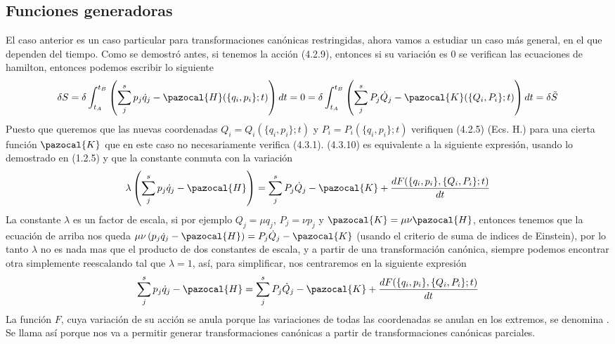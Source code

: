 \subsection{Funciones generadoras}
El caso anterior es un caso particular para transformaciones canónicas restringidas, ahora vamos a estudiar un caso más general, en el que dependen del tiempo. Como se demostró antes, si tenemos la acción (4.2.9), entonces si su variación es $0$ se verifican las ecuaciones de hamilton, entonces podemos escribir lo siguiente
\begin{equation} \label{4.2.7}
    \delta S = \delta\int_{t_A}^{t_B} \left(\sum_j^s p_j \dot{q}_j -\pazocal{H}(\{q_i,p_i\};t)\right) dt = 0 = \delta\int_{t_A}^{t_B} \left(\sum_j^s P_j \dot{Q}_j -\pazocal{K}(\{Q_i,P_i\};t)\right) dt = \delta \tilde{S}
\end{equation} 
Puesto que queremos que las nuevas coordenadas $Q_i=Q_i(\{q_i,p_i\};t)$ y $P_i=P_i(\{q_i,p_i\};t)$ verifiquen (4.2.5) (Ecs. H.) para una cierta función $\pazocal{K}$ que en este caso no necesariamente verifica (4.3.1). (4.3.10) es equivalente a la siguiente expresión, usando lo demostrado en (1.2.5) y que la constante conmuta con la variación
\begin{equation} \label{4.2.7}
    \lambda\left(\sum_j^s p_j \dot{q}_j -\pazocal{H}\right) = \sum_j^s P_j \dot{Q}_j -\pazocal{K} +  \frac{dF(\{q_i,p_i\},\{Q_i,P_i\};t)}{dt}
\end{equation} 
La constante $\lambda$ es un factor de escala, si por ejemplo $Q_j = \mu q_j$, $P_j = \nu p_j$ y $\pazocal{K} = \mu \nu \pazocal{H}$, entonces tenemos que la ecuación de arriba nos queda $\mu\nu\left(p_j \dot{q}_j -\pazocal{H}\right) = P_j \dot{Q}_j -\pazocal{K}$ (usando el criterio de suma de indices de Einstein), por lo tanto $\lambda$ no es nada mas que el producto de dos constantes de escala, y a partir de una transformación canónica, siempre podemos encontrar otra simplemente reescalando tal que $\lambda = 1$, así, para simplificar, nos centraremos en la siguiente expresión 
\begin{equation} \label{4.2.7}
    \sum_j^s p_j \dot{q}_j -\pazocal{H} = \sum_j^s P_j \dot{Q}_j -\pazocal{K} + \frac{dF(\{q_i,p_i\},\{Q_i,P_i\};t)}{dt}
\end{equation} 
La función $F$, cuya variación de su acción se anula porque las variaciones de todas las coordenadas se anulan en los extremos, se denomina . Se llama así porque nos va a permitir generar transformaciones canónicas a partir de transformaciones canónicas parciales.
